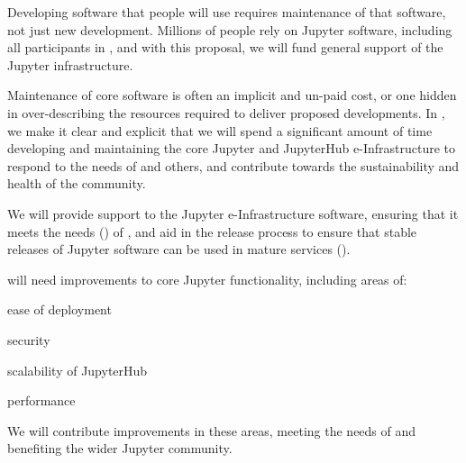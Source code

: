 \begin{task}[
  title=Maintenance of open source reproducibility software,
  id=maintenance,
  lead=SRL,
  PM=6,
  wphases={0-24!.25},
  partners={QS}
]

  


Developing software that people will use requires maintenance of that software,
not just new development. Millions of people rely on Jupyter software, including
all participants in \TheProject, and with this proposal, we will fund general
support of the Jupyter infrastructure.

Maintenance of core software is often an implicit and un-paid cost, or one
hidden in over-describing the resources required to deliver proposed
developments. In \TheProject, we make it clear and explicit that we will spend a
significant amount of time developing and maintaining the core Jupyter and
JupyterHub e-Infrastructure to respond to the needs of \TheProject and others,
and contribute towards the sustainability and health of the community.

We will provide support to the Jupyter e-Infrastructure software, ensuring that
it meets the needs () of \TheProject, and
aid in the release process to ensure that stable releases of Jupyter software
can be used in mature \TheProject services ().

  \TheProject will need improvements to core Jupyter functionality, including areas of:

  \begin{compactenum}
    \item ease of deployment
    \item security
    \item scalability of JupyterHub
    \item performance
  \end{compactenum}

  We will contribute improvements in these areas,
  meeting the needs of \TheProject and benefiting the wider Jupyter
  community.

\end{task}
